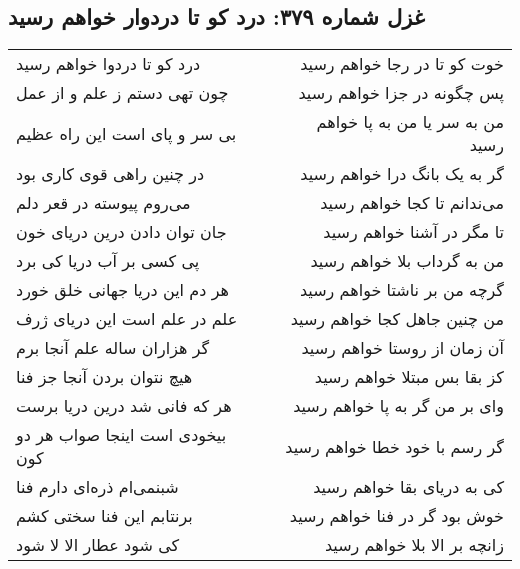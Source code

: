 \begin{center}
\section*{غزل شماره ۳۷۹: درد کو تا دردوار خواهم رسید}
\label{sec:379}
\begin{longtable}{l p{0.5cm} r}
درد کو تا دردوا خواهم رسید
&&
خوت کو تا در رجا خواهم رسید
\\
چون تهی دستم ز علم و از عمل
&&
پس چگونه در جزا خواهم رسید
\\
بی سر و پای است این راه عظیم
&&
من به سر یا من به پا خواهم رسید
\\
در چنین راهی قوی کاری بود
&&
گر به یک بانگ درا خواهم رسید
\\
می‌روم پیوسته در قعر دلم
&&
می‌ندانم تا کجا خواهم رسید
\\
جان توان دادن درین دریای خون
&&
تا مگر در آشنا خواهم رسید
\\
پی کسی بر آب دریا کی برد
&&
من به گرداب بلا خواهم رسید
\\
هر دم این دریا جهانی خلق خورد
&&
گرچه من بر ناشتا خواهم رسید
\\
علم در علم است این دریای ژرف
&&
من چنین جاهل کجا خواهم رسید
\\
گر هزاران ساله علم آنجا برم
&&
آن زمان از روستا خواهم رسید
\\
هیچ نتوان بردن آنجا جز فنا
&&
کز بقا بس مبتلا خواهم رسید
\\
هر که فانی شد درین دریا برست
&&
وای بر من گر به پا خواهم رسید
\\
بیخودی است اینجا صواب هر دو کون
&&
گر رسم با خود خطا خواهم رسید
\\
شبنمی‌ام ذره‌ای دارم فنا
&&
کی به دریای بقا خواهم رسید
\\
برنتابم این فنا سختی کشم
&&
خوش بود گر در فنا خواهم رسید
\\
کی شود عطار الا لا شود
&&
زانچه بر الا بلا خواهم رسید
\\
\end{longtable}
\end{center}
